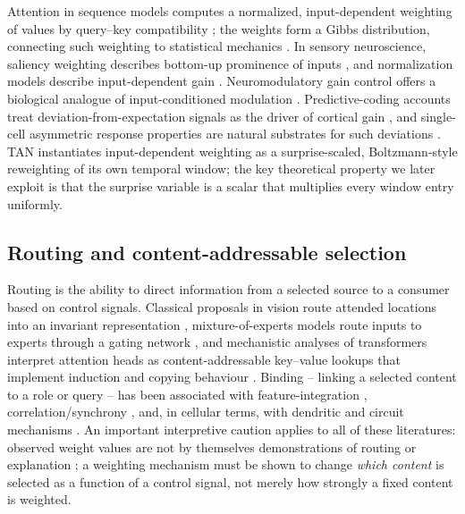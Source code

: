 Attention in sequence models computes a normalized, input-dependent
weighting of values by query--key compatibility
\citep{vaswani2017,bahdanau2015}; the weights form a Gibbs distribution,
connecting such weighting to statistical mechanics
\citep{jaynes1957,gibbs1902}.  In sensory neuroscience, saliency
weighting describes bottom-up prominence of inputs
\citep{koch1985,itti1998}, and normalization models describe
input-dependent gain \citep{reynolds2009}.  Neuromodulatory gain control
offers a biological analogue of input-conditioned modulation
\citep{astonjones2005,yudayan2005}.  Predictive-coding accounts treat
deviation-from-expectation signals as the driver of cortical gain
\citep{rao1999,srinivasan1982,friston2005,keller2018,bastos2012}, and
single-cell asymmetric response properties are natural substrates for
such deviations \citep{laughlin1981}.  TAN instantiates input-dependent
weighting as a surprise-scaled, Boltzmann-style reweighting of its own
temporal window; the key theoretical property we later exploit is that
the surprise variable is a scalar that multiplies every window entry
uniformly.

\subsection{Routing and content-addressable selection}\label{sec:bkg-routing}

Routing is the ability to direct information from a selected source to a
consumer based on control signals.  Classical proposals in vision route
attended locations into an invariant representation
\citep{olshausen1993}, mixture-of-experts models route inputs to experts
through a gating network \citep{jacobs1991,shazeer2017,fedus2022}, and
mechanistic analyses of transformers interpret attention heads as
content-addressable key--value lookups that implement induction and
copying behaviour \citep{elhage2021,olsson2022}.  Binding -- linking a
selected content to a role or query -- has been associated with
feature-integration \citep{treisman1980}, correlation/synchrony
\citep{von_der_malsburg1995,von_der_malsburg1986,singer1995,fries2005},
and, in cellular terms, with dendritic and circuit mechanisms
\citep{london2005,larkum2013,spruston2008}.  An important interpretive
caution applies to all of these literatures: observed weight values are
not by themselves demonstrations of routing or explanation
\citep{jainwallace2019,serranosmith2019,wiegreffe2019}; a weighting
mechanism must be shown to change \emph{which content} is selected as a
function of a control signal, not merely how strongly a fixed content is
weighted.

